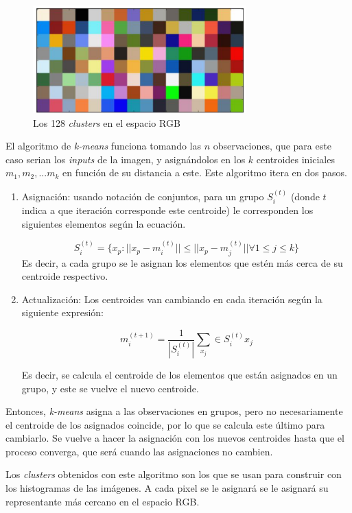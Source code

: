 \documentclass[14pt,a4paper]{report}
\begin{document}
\begin{figure}[h]
  \centering
\includegraphics[scale=0.7]{../clusters-kmeans.png} 
  \caption{Los 128 \textit{clusters} en el espacio RGB}
  \label{fig:neural-network}
\end{figure}

El algoritmo de \textit{k-means} funciona tomando las $n$ observaciones, que para este caso serian los \textit{inputs} de la imagen, y asignándolos en los $k$ centroides iniciales $m_1, m_2, ... m_k$ en función de su distancia a este. Este algoritmo itera en dos pasos.
\begin{enumerate}
\item Asignación: usando notación de conjuntos, para un grupo $S^{(t)}_{i}$ (donde $t$ indica a que iteración corresponde este centroide) le corresponden los siguientes elementos según la ecuación.

$$
S^{(t)}_{i} = \{x_p:||x_p-m^{(t)}_{i}||\leq||x_p-m^{(t)}_{j}||\forall 1\leq j \leq k\}
$$
Es decir, a cada grupo se le asignan los elementos que estén más cerca de su centroide respectivo.
\item Actualización: Los centroides van cambiando en cada iteración según la siguiente expresión:

$$
m^{(t+1)}_{i} = \frac{1}{|S^{(t)}_{i}|}\sum_{x_{j}}\in S^{(t)}_{i}x_{j}
$$

Es decir, se calcula el centroide de los elementos que están asignados en un grupo, y este se vuelve el nuevo centroide.

\end{enumerate} 

Entonces, \textit{k-means} asigna a las observaciones en grupos, pero no necesariamente el centroide de los asignados coincide, por lo que se calcula este último para cambiarlo. Se vuelve a hacer la asignación con los nuevos centroides hasta que el proceso converga, que será cuando las asignaciones no cambien.

Los \textit{clusters} obtenidos con este algoritmo son los que se usan para construir con los histogramas de las imágenes. A cada pixel se le asignará se le asignará su representante más cercano en el espacio RGB.
\end{document}
